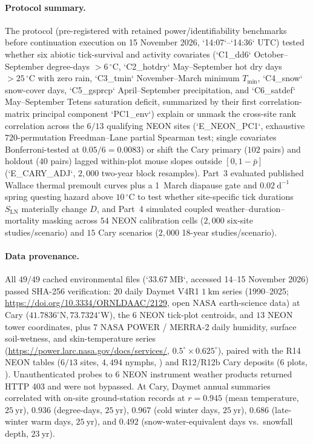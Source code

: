 \paragraph{Protocol summary.}
The protocol (pre-registered with retained power/identifiability benchmarks before continuation execution on 15 November 2026, `14:07`--`14:36` UTC) tested whether six abiotic tick-survival and activity covariates (`C1\_dd6` October--September degree-days $> 6\,^{\circ}\mathrm{C}$, `C2\_hotdry` May--September hot dry days $> 25\,^{\circ}\mathrm{C}$ with zero rain, `C3\_tmin` November--March minimum $T_{\min}$, `C4\_snow` snow-cover days, `C5\_gsprcp` April--September precipitation, and `C6\_satdef` May--September Tetens saturation deficit, summarized by their first correlation-matrix principal component `PC1\_env`) explain or unmask the cross-site rank correlation across the $6/13$ qualifying NEON sites (`E\_NEON\_PC1`, exhaustive $720$-permutation Freedman--Lane partial Spearman test; single covariates Bonferroni-tested at $0.05/6 = 0.0083$) or shift the Cary primary ($102$ pairs) and holdout ($40$ pairs) lagged within-plot mouse slopes outside $[0, 1 - \bar{p}]$ (`E\_CARY\_ADJ`, $2{,}000$ two-year block resamples). Part~3 evaluated published Wallace thermal premoult curves plus a 1~March diapause gate and $0.02\ \mathrm{d}^{-1}$ spring questing hazard above $10\,^{\circ}\mathrm{C}$ to test whether site-specific tick durations $S_{\mathrm{LN}}$ materially change $D$, and Part~4 simulated coupled weather--duration--mortality masking across $54$ NEON calibration cells ($2{,}000$ six-site studies/scenario) and $15$ Cary scenarios ($2{,}000$ 18-year studies/scenario).

\paragraph{Data provenance.}
All $49/49$ cached environmental files (`$33.67\ \mathrm{MB}$`, accessed 14--15 November 2026) passed SHA-256 verification: $20$ daily Daymet V4R1 $1\ \mathrm{km}$ series (1990--2025; \url{https://doi.org/10.3334/ORNLDAAC/2129}, open NASA earth-science data) \citep{thornton2022} at Cary ($41.7836^{\circ}\mathrm{N}, 73.7324^{\circ}\mathrm{W}$), the $6$ NEON tick-plot centroids, and $13$ NEON tower coordinates, plus $7$ NASA POWER / MERRA-2 daily humidity, surface soil-wetness, and skin-temperature series (\url{https://power.larc.nasa.gov/docs/services/}, $0.5^\circ \times 0.625^\circ$), paired with the R14 NEON tables ($6/13$ sites, $4{,}494$ nymphs, \citealp{neon2026a,neon2026b,neon2026c}) and R12/R12b Cary deposits ($6$ plots, \citealp{ostfeld20182019,ostfeld2026b,ladeau2025}). Unauthenticated probes to $6$ NEON instrument weather products returned HTTP 403 and were not bypassed. At Cary, Daymet annual summaries correlated with on-site ground-station records at $r = 0.945$ (mean temperature, $25\ \mathrm{yr}$), $0.936$ (degree-days, $25\ \mathrm{yr}$), $0.967$ (cold winter days, $25\ \mathrm{yr}$), $0.686$ (late-winter warm days, $25\ \mathrm{yr}$), and $0.492$ (snow-water-equivalent days vs.\ snowfall depth, $23\ \mathrm{yr}$).

